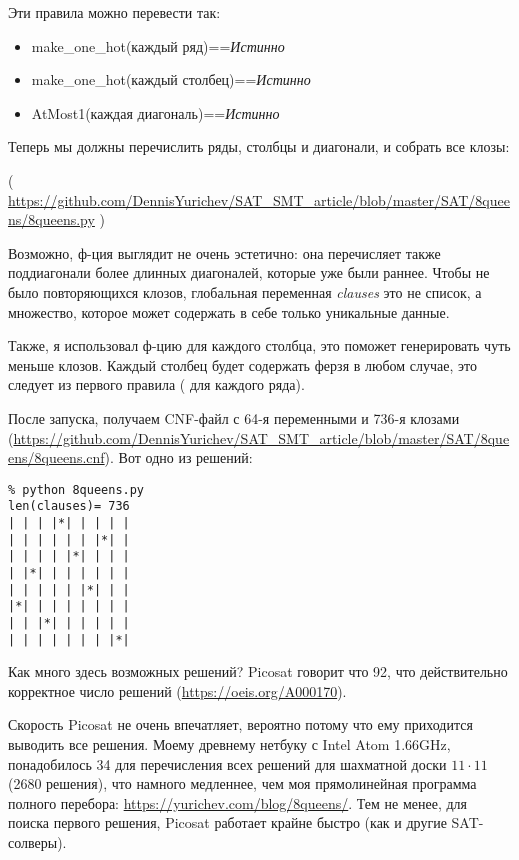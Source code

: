 Эти правила можно перевести так:

\begin{itemize}
\item make\_one\_hot(каждый ряд)==\textit{Истинно}

\item make\_one\_hot(каждый столбец)==\textit{Истинно}

\item AtMost1(каждая диагональ)==\textit{Истинно}
\end{itemize}

Теперь мы должны перечислить ряды, столбцы и диагонали, и собрать все клозы:


( \url{https://github.com/DennisYurichev/SAT_SMT_article/blob/master/SAT/8queens/8queens.py} )

Возможно, ф-ция  выглядит не очень эстетично:
она перечисляет также поддиагонали более длинных диагоналей, которые уже были раннее.
Чтобы не было повторяющихся клозов, глобальная переменная \textit{clauses} это не список, а множество,
которое может содержать в себе только уникальные данные.

Также, я использовал ф-цию  для каждого столбца, это поможет генерировать чуть меньше клозов.
Каждый столбец будет содержать ферзя в любом случае, это следует из первого правила ( для каждого ряда).

После запуска, получаем CNF-файл с 64-я переменными и 736-я клозами (\url{https://github.com/DennisYurichev/SAT_SMT_article/blob/master/SAT/8queens/8queens.cnf}).
Вот одно из решений:

\begin{lstlisting}
% python 8queens.py
len(clauses)= 736
| | | |*| | | | |
| | | | | | |*| |
| | | | |*| | | |
| |*| | | | | | |
| | | | | |*| | |
|*| | | | | | | |
| | |*| | | | | |
| | | | | | | |*|
\end{lstlisting}

Как много здесь возможных решений?
Picosat говорит что 92, что действительно корректное число решений (\url{https://oeis.org/A000170}).

Скорость Picosat не очень впечатляет, вероятно потому что ему приходится выводить все решения.
Моему древнему нетбуку с Intel Atom 1.66GHz, понадобилось 34 для перечисления всех решений для шахматной доски
$11 \cdot 11$ 
(2680 решения),
что намного медленнее, чем моя прямолинейная программа полного перебора: \url{https://yurichev.com/blog/8queens/}.
Тем не менее, для поиска первого решения, Picosat работает крайне быстро (как и другие SAT-солверы).

